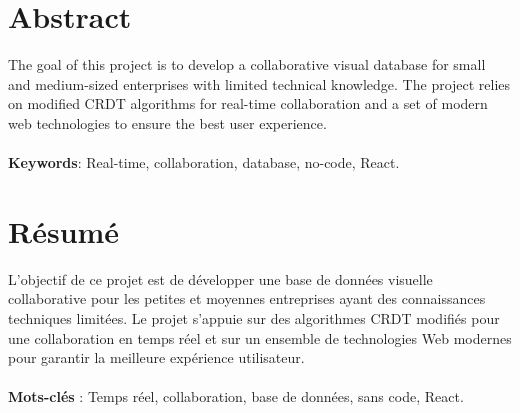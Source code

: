 


\begingroup
\let\clearpage\relax
{}

\chapter*{Abstract}
The goal of this project is to develop a collaborative visual database for small and medium-sized enterprises with limited technical knowledge. The project relies on modified CRDT algorithms for real-time collaboration and a set of modern web technologies to ensure the best user experience.
\\~\\
\textbf{Keywords}: Real-time, collaboration, database, no-code, React.

\vspace{1cm}

\chapter*{Résumé}
L'objectif de ce projet est de développer une base de données visuelle collaborative pour les petites et moyennes entreprises ayant des connaissances techniques limitées. Le projet s'appuie sur des algorithmes CRDT modifiés pour une collaboration en temps réel et sur un ensemble de technologies Web modernes pour garantir la meilleure expérience utilisateur.
\\~\\
\textbf{Mots-clés} : Temps réel, collaboration, base de données, sans code, React.

\endgroup

